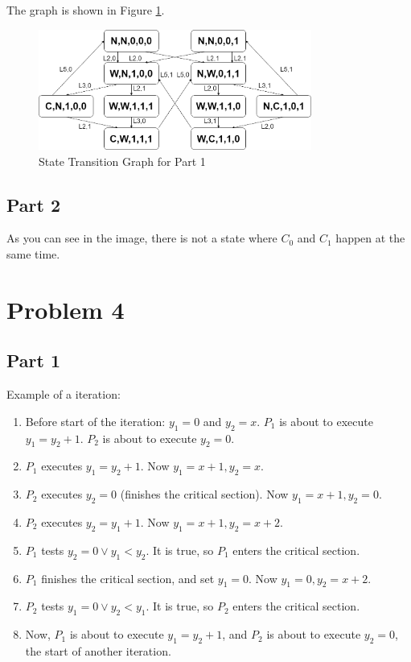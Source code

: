 The graph is shown in Figure \ref{fig:hw1-3-1}.

\begin{figure}[h]
    \centering
    \includegraphics[width=0.8\textwidth]{image/hw1-3-1.drawio.png}
    \caption{State Transition Graph for Part 1}
    \label{fig:hw1-3-1}
\end{figure}

\subsection{Part 2}

As you can see in the image, there is not a state where $C_0$ and $C_1$ happen at the same time.

\section{Problem 4}

\subsection{Part 1}

Example of a iteration:

\begin{enumerate}
    \item Before start of the iteration:
        $y_1 = 0$ and $y_2 = x$.
        $P_1$ is about to execute $y_1 = y_2 + 1$.
        $P_2$ is about to execute $y_2 = 0$.
    \item $P_1$ executes $y_1 = y_2 + 1$.
        Now $y_1 = x + 1, y_2 = x$.
    \item $P_2$ executes $y_2 = 0$ (finishes the critical section).
        Now $y_1 = x + 1, y_2 = 0$.
    \item $P_2$ executes $y_2 = y_1 + 1$.
        Now $y_1 = x + 1, y_2 = x + 2$.
    \item $P_1$ tests $y_2 = 0 \vee y_1 < y_2$.
        It is true, so $P_1$ enters the critical section.
    \item $P_1$ finishes the critical section, and set $y_1 = 0$.
        Now $y_1 = 0, y_2 = x + 2$.
    \item $P_2$ tests $y_1 = 0 \vee y_2 < y_1$.
        It is true, so $P_2$ enters the critical section.
    \item Now, $P_1$ is about to execute $y_1 = y_2 + 1$,
        and $P_2$ is about to execute $y_2 = 0$, the start of another iteration.
\end{enumerate}

